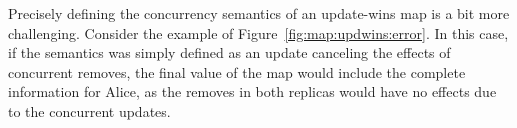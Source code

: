 \documentclass[12pt]{article}
\begin{document}
Precisely defining the concurrency semantics of an update-wins map is a bit more challenging.
Consider the example of Figure~\ref{fig:map:updwins:error}.
In this case, if the semantics was simply defined as an update canceling the effects of concurrent 
removes, the final value of the map would include the complete information for Alice, as the 
removes in both replicas would have no effects due to the concurrent updates.
 
\end{document}
